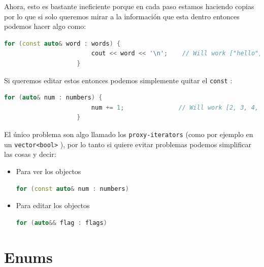 \documentclass[12pt, fleqn]{report}                             %
\theoremstyle{break}                                            %
\newcommand{\textCode}[1]  { \texttt{#1} }                      %
\begin{document}
                Ahora, esto es bastante ineficiente porque en cada paso estamos haciendo copias
                por lo que si solo queremos mirar a la información que esta dentro entonces podemos hacer
                algo como:
                \begin{lstlisting}[language=C++, gobble=20]
                    for (const auto& word : words) {
                        cout << word << '\n';    // Will work ["hello", "world", ":D"]
                    }
                \end{lstlisting}

                Si queremos editar estos entonces podemos simplemente quitar el \textCode{const}:
                \begin{lstlisting}[language=C++, gobble=20]
                    for (auto& num : numbers) {
                        num += 1;               // Will work [2, 3, 4, 5, 6]
                    }
                \end{lstlisting}

                El único problema son algo llamado los \textCode{proxy-iterators} 
                (como por ejemplo en un \textCode{vector<bool>}), por lo tanto
                si quiere evitar problemas podemos simplificar las cosas y decir:
                \begin{itemize}
                    \item Para ver los objectos
                        \begin{lstlisting}[language=C++, gobble=28]
                            for (const auto& num : numbers)
                        \end{lstlisting}
                    \item Para editar los objectos
                        \begin{lstlisting}[language=C++, gobble=28]
                            for (auto&& flag : flags)
                        \end{lstlisting}
                \end{itemize}

                \cite{forauto}

        \section{Enums}
\end{document}
